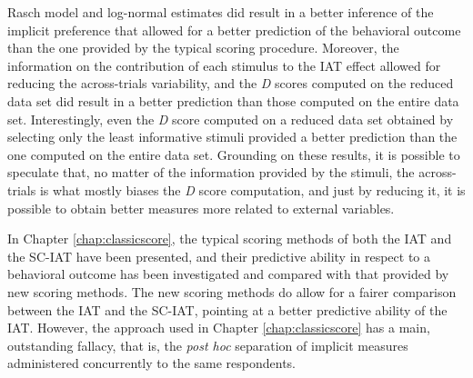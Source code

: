 \documentclass[12pt]{book}
\begin{document}
Rasch model and log-normal estimates did result in a better inference of the implicit preference that allowed for a better prediction of the behavioral outcome than the one provided by the typical scoring procedure. 
Moreover, the information on the contribution of each stimulus to the IAT effect allowed for reducing the across-trials variability, and the \emph{D} scores computed on the reduced data set did result in a better prediction than those computed on the entire data set. Interestingly, even the \emph{D} score computed on a reduced data set obtained by selecting only the least informative stimuli provided a better prediction than the one computed on the entire data set. 
Grounding on these results, it is possible to speculate that, no matter of the information provided by the stimuli, the across-trials is what mostly biases the \emph{D} score computation, and just by reducing it, it is possible to obtain better measures more related to external variables.

In Chapter \ref{chap:classicscore}, the typical scoring methods of both the IAT and the SC-IAT have been presented, and their predictive ability in respect to a behavioral outcome has been investigated and compared with that provided by new scoring methods. 
The new scoring methods do allow for a fairer comparison between the IAT and the SC-IAT, pointing at a better predictive ability of the IAT. 
However, the approach used in Chapter \ref{chap:classicscore} has a main, outstanding fallacy, that is, the \emph{post hoc} separation of implicit measures administered concurrently to the same respondents. 
\end{document}
